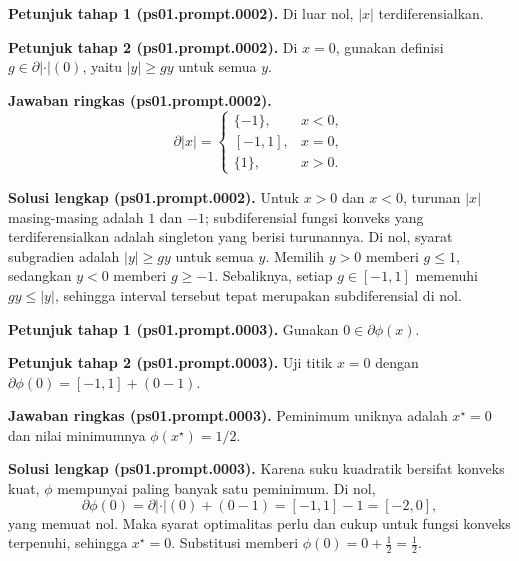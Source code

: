 \par\noindent\textbf{Petunjuk tahap 1 (ps01.prompt.0002).}
Di luar nol, $|x|$ terdiferensialkan.
\label{orig03:ps01:hint1:0002}
\par\noindent\textbf{Petunjuk tahap 2 (ps01.prompt.0002).}
Di $x=0$, gunakan definisi $g\in\partial |\cdot|(0)$, yaitu
$|y|\geq gy$ untuk semua $y$.
\label{orig03:ps01:hint2:0002}
\par\noindent\textbf{Jawaban ringkas (ps01.prompt.0002).}
\[
 \partial |x|=
 \begin{cases}
   \{-1\},&x<0,\\
   [-1,1],&x=0,\\
   \{1\},&x>0.
 \end{cases}
\]
\label{orig03:ps01:answer:0002}
\par\noindent\textbf{Solusi lengkap (ps01.prompt.0002).}
Untuk $x>0$ dan $x<0$, turunan $|x|$ masing-masing adalah $1$ dan $-1$;
subdiferensial fungsi konveks yang terdiferensialkan adalah singleton yang
berisi turunannya. Di nol, syarat subgradien adalah $|y|\geq gy$ untuk semua
$y$. Memilih $y>0$ memberi $g\leq1$, sedangkan $y<0$ memberi $g\geq-1$.
Sebaliknya, setiap $g\in[-1,1]$ memenuhi $gy\leq|y|$, sehingga interval
tersebut tepat merupakan subdiferensial di nol.
\label{orig03:ps01:solution:0002}

\par\noindent\textbf{Petunjuk tahap 1 (ps01.prompt.0003).}
Gunakan $0\in\partial\phi(x)$.
\label{orig03:ps01:hint1:0003}
\par\noindent\textbf{Petunjuk tahap 2 (ps01.prompt.0003).}
Uji titik $x=0$ dengan
$\partial\phi(0)=[-1,1]+(0-1)$.
\label{orig03:ps01:hint2:0003}
\par\noindent\textbf{Jawaban ringkas (ps01.prompt.0003).}
Peminimum uniknya adalah $x^\star=0$ dan nilai minimumnya $\phi(x^\star)=1/2$.
\label{orig03:ps01:answer:0003}
\par\noindent\textbf{Solusi lengkap (ps01.prompt.0003).}
Karena suku kuadratik bersifat konveks kuat, $\phi$ mempunyai paling banyak
satu peminimum. Di nol,
\[
 \partial\phi(0)=\partial|\cdot|(0)+(0-1)=[-1,1]-1=[-2,0],
\]
yang memuat nol. Maka syarat optimalitas perlu dan cukup untuk fungsi konveks
terpenuhi, sehingga $x^\star=0$. Substitusi memberi
$\phi(0)=0+\tfrac12=\tfrac12$.
\label{orig03:ps01:solution:0003}

